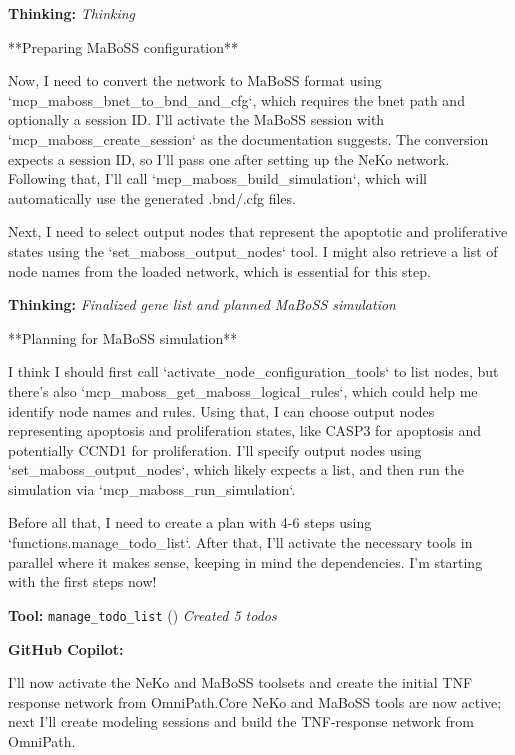 \documentclass[11pt,a4paper]{article}
\begin{document}
\begin{thinkbox}
\textbf{Thinking:} \textit{Thinking}

**Preparing MaBoSS configuration**

Now, I need to convert the network to MaBoSS format using `mcp\_maboss\_bnet\_to\_bnd\_and\_cfg`, which requires the bnet path and optionally a session ID. I’ll activate the MaBoSS session with `mcp\_maboss\_create\_session` as the documentation suggests. The conversion expects a session ID, so I’ll pass one after setting up the NeKo network. Following that, I'll call `mcp\_maboss\_build\_simulation`, which will automatically use the generated .bnd/.cfg files.

Next, I need to select output nodes that represent the apoptotic and proliferative states using the `set\_maboss\_output\_nodes` tool. I might also retrieve a list of node names from the loaded network, which is essential for this step.

\end{thinkbox}
\begin{thinkbox}
\textbf{Thinking:} \textit{Finalized gene list and planned MaBoSS simulation}

**Planning for MaBoSS simulation**

I think I should first call `activate\_node\_configuration\_tools` to list nodes, but there's also `mcp\_maboss\_get\_maboss\_logical\_rules`, which could help me identify node names and rules. Using that, I can choose output nodes representing apoptosis and proliferation states, like CASP3 for apoptosis and potentially CCND1 for proliferation. I’ll specify output nodes using `set\_maboss\_output\_nodes`, which likely expects a list, and then run the simulation via `mcp\_maboss\_run\_simulation`.

Before all that, I need to create a plan with 4-6 steps using `functions.manage\_todo\_list`. After that, I'll activate the necessary tools in parallel where it makes sense, keeping in mind the dependencies. I’m starting with the first steps now!

\end{thinkbox}
\begin{toolokbox}
\textbf{Tool:} \texttt{manage\_todo\_list} (\checkmark)
\textit{Created 5 todos}
\end{toolokbox}
\begin{copilotbox}
\textbf{GitHub Copilot:}

I'll now activate the NeKo and MaBoSS toolsets and create the initial TNF response network from OmniPath.Core NeKo and MaBoSS tools are now active; next I’ll create modeling sessions and build the TNF-response network from OmniPath.

\end{copilotbox}
\end{document}
